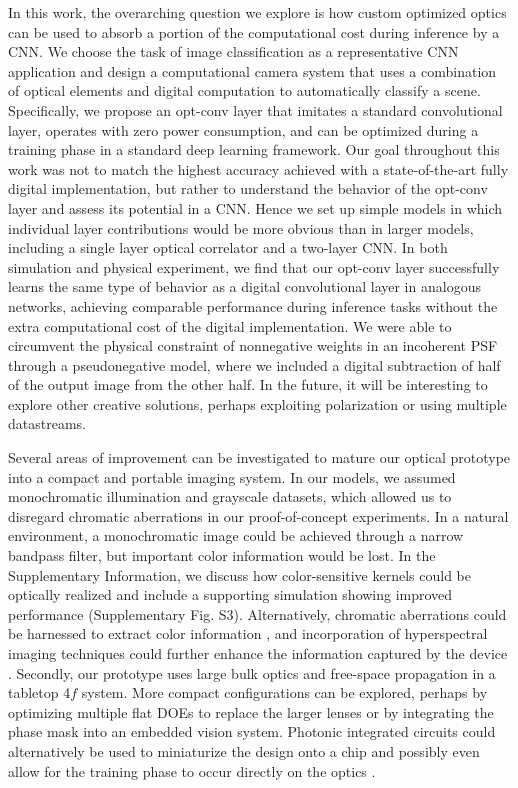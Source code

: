 \documentclass[fleqn,10pt]{wlscirep}
\begin{document}
In this work, the overarching question we explore is how custom optimized optics can be used to absorb a portion of the computational cost during inference by a CNN. We choose the task of image classification as a representative CNN application and design a computational camera system that uses a combination of optical elements and digital computation to automatically classify a scene. Specifically, we propose an opt-conv layer that imitates a standard convolutional layer, operates with zero power consumption, and can be optimized during a training phase in a standard deep learning framework. Our goal throughout this work was not to match the highest accuracy achieved with a state-of-the-art fully digital implementation, but rather to understand the behavior of the opt-conv layer and assess its potential in a CNN. Hence we set up simple models in which individual layer contributions would be more obvious than in larger models, including a single layer optical correlator and a two-layer CNN. In both simulation and physical experiment, we find that our opt-conv layer successfully learns the same type of behavior as a digital convolutional layer in analogous networks, achieving comparable performance during inference tasks without the extra computational cost of the digital implementation. We were able to circumvent the physical constraint of nonnegative weights in an incoherent PSF through a pseudonegative model, where we included a digital subtraction of half of the output image from the other half. In the future, it will be interesting to explore other creative solutions, perhaps exploiting polarization or using multiple datastreams. 

Several areas of improvement can be investigated to mature our optical prototype into a compact and portable imaging system. In our models, we assumed monochromatic illumination and grayscale datasets, which allowed us to disregard chromatic aberrations in our proof-of-concept experiments. In a natural environment, a monochromatic image could be achieved through a narrow bandpass filter, but important color information would be lost. In the Supplementary Information, we discuss how color-sensitive kernels could be optically realized and include a supporting simulation showing improved performance (Supplementary Fig. S3). Alternatively, chromatic aberrations could be harnessed to extract color information \cite{shechtman2016multicolour}, and incorporation of hyperspectral imaging techniques could further enhance the information captured by the device \cite{chang2007hyperspectral}. Secondly, our prototype uses large bulk optics and free-space propagation in a tabletop 4$f$ system. More compact configurations can be explored, perhaps by optimizing multiple flat DOEs to replace the larger lenses or by integrating the phase mask into an embedded vision system. Photonic integrated circuits could alternatively be used to miniaturize the design onto a chip and possibly even allow for the training phase to occur directly on the optics \cite{sun2013large,rechtsman2013photonic,shen2017deep}. 
\end{document}
